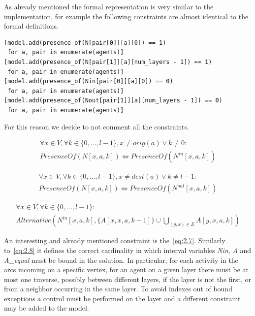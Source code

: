 \documentclass[12pt, a4paper, hidelinks]{article}
\numberwithin{equation}{section}
\begin{document}
As already mentioned the formal representation is very similar to the implementation, for example the following constraints are almost identical to the formal definitions.

\begin{lstlisting}[label={lst:eq2.1-2.4}]
[model.add(presence_of(N[pair[0]][a][0]) == 1)
 for a, pair in enumerate(agents)]
[model.add(presence_of(N[pair[1]][a][num_layers - 1]) == 1)
 for a, pair in enumerate(agents)]
[model.add(presence_of(Nin[pair[0]][a][0]) == 0)
 for a, pair in enumerate(agents)]
[model.add(presence_of(Nout[pair[1]][a][num_layers - 1]) == 0)
 for a, pair in enumerate(agents)]
\end{lstlisting}

For this reason we decide to not comment all the constraints.

\begin{description}\label{eq:equation_set_2.2}
\item \begin{equation}\begin{split} \forall x \in V, \forall k \in \{0,\dots,l-1\}, x \neq orig(a) \lor k \neq 0: \\ PresenceOf(N[x,a,k]) \iff PresenceOf(N^{in}[x,a,k]) \end{split}\label{eq:2.5}\end{equation}
\item \begin{equation}\begin{split} \forall x \in V, \forall k \in \{0,\dots,l-1\}, x \neq dest(a) \lor k \neq l-1: \\ PresenceOf(N[x,a,k]) \iff PresenceOf(N^{out}[x,a,k]) \end{split}\label{eq:2.6}\end{equation}
\item \begin{equation}\begin{split} \forall x \in V, \forall k \in \{0,\dots,l-1\}: \\ Alternative(N^{in}[x,a,k], \{A[x,x,a,k-1]\} \cup \bigcup_{(y,x) \in E} A[y,x,a,k]) \end{split}\label{eq:2.7}\end{equation}
\end{description}

An interesting and already mentioned constraint is the~\ref{eq:2.7}.
Similarly to~\ref{eq:2.8} it defines the correct cardinality in which interval variables \textit{Nin}, \textit{A} and \textit{A\_equal} must be bound in the solution.
In particular, for each activity in the arcs incoming on a specific vertex, for an agent on a given layer there must be at most one traverse, possibly between different layers, if the layer is not the first, or from a neighbor occurring in the same layer.
To avoid indexes out of bound exceptions a control must be performed on the layer and a different constraint may be added to the model.
\end{document}
